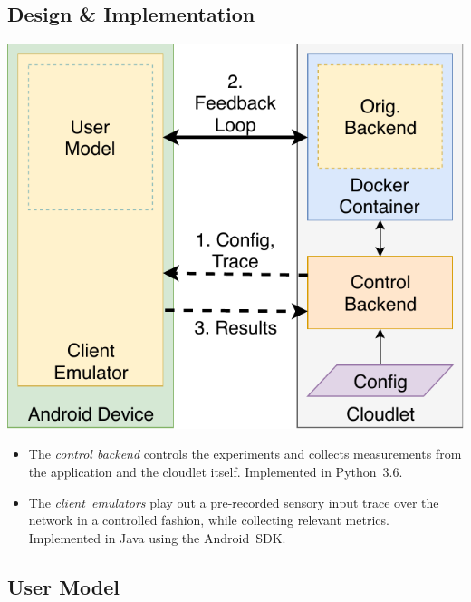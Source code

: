 \documentclass[portrait, a1]{KTHEEposter}
\begin{document}
\begin{pcolumns}[3]
\begin{pcolumn}[2]
\begin{pframe}[.9]
            \section{Design \& Implementation}
            \begin{center}
                \medskip
                \includegraphics[width=.9\linewidth]{img/TraceReplay_GenArch}
                \medskip
            \end{center}
            \begin{itemize}
                \item The \emph{control backend} controls the experiments and collects measurements from the application and the cloudlet itself.
                Implemented in Python~3.6.
                \item The \emph{client~emulators} play out a pre-recorded sensory input trace over the network in a controlled fashion, while collecting relevant metrics.
                Implemented in Java using the Android~SDK.%
            \end{itemize}
        \end{pframe}
        \begin{pframe}[1.1]
            \section{User Model}
            \begin{center}
                \medskip
                
                \medskip
            \end{center}


\end{pframe}
\end{pcolumn}
\end{pcolumns}
\end{document}
